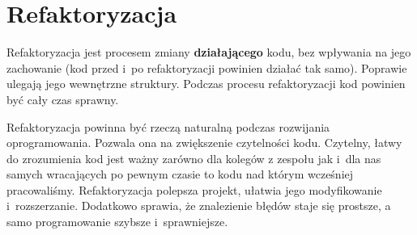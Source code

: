 \section{Refaktoryzacja}

Refaktoryzacja jest procesem zmiany \textbf{działającego} kodu, bez wpływania na jego zachowanie (kod przed i~po refaktoryzacji powinien działać tak samo). Poprawie ulegają jego wewnętrzne struktury. Podczas procesu refaktoryzacji kod powinien być cały czas sprawny. 

Refaktoryzacja powinna być rzeczą naturalną podczas rozwijania oprogramowania. Pozwala ona na zwiększenie czytelności kodu. Czytelny, łatwy do zrozumienia kod jest ważny zarówno dla kolegów z zespołu jak i~dla nas samych wracających po pewnym czasie to kodu nad którym wcześniej pracowaliśmy. Refaktoryzacja polepsza projekt, ułatwia jego modyfikowanie i~rozszerzanie. Dodatkowo sprawia, że znalezienie błędów staje się prostsze, a samo programowanie szybsze i~sprawniejsze.

